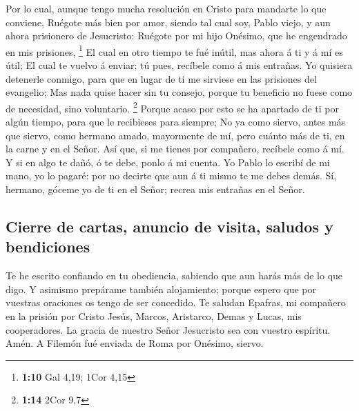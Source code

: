  Por lo cual, aunque tengo mucha resolución en Cristo para
mandarte lo que conviene,  Ruégote más bien por amor,
siendo tal cual soy, Pablo viejo, y aun ahora prisionero de Jesucristo:
 Ruégote por mi hijo Onésimo, que he engendrado en mis
prisiones, \footnote{\textbf{1:10} Gal 4,19; 1Cor 4,15} 
El cual en otro tiempo te fué inútil, mas ahora á ti y á mí es útil;
 El cual te vuelvo á enviar; tú pues, recíbele como á mis
entrañas.  Yo quisiera detenerle conmigo, para que en
lugar de ti me sirviese en las prisiones del evangelio; 
Mas nada quise hacer sin tu consejo, porque tu beneficio no fuese como
de necesidad, sino voluntario. \footnote{\textbf{1:14} 2Cor 9,7}
 Porque acaso por esto se ha apartado de ti por algún
tiempo, para que le recibieses para siempre;  No ya como
siervo, antes más que siervo, como hermano amado, mayormente de mí, pero
cuánto más de ti, en la carne y en el Señor.  Así que, si
me tienes por compañero, recíbele como á mí.  Y si en
algo te dañó, ó te debe, ponlo á mi cuenta.  Yo Pablo lo
escribí de mi mano, yo lo pagaré: por no decirte que aun á ti mismo te
me debes demás.  Sí, hermano, góceme yo de ti en el
Señor; recrea mis entrañas en el Señor.

\hypertarget{cierre-de-cartas-anuncio-de-visita-saludos-y-bendiciones}{%
\subsection{Cierre de cartas, anuncio de visita, saludos y
bendiciones}\label{cierre-de-cartas-anuncio-de-visita-saludos-y-bendiciones}}

 Te he escrito confiando en tu obediencia, sabiendo que
aun harás más de lo que digo.  Y asimismo prepárame
también alojamiento; porque espero que por vuestras oraciones os tengo
de ser concedido.  Te saludan Epafras, mi compañero en la
prisión por Cristo Jesús,  Marcos, Aristarco, Demas y
Lucas, mis cooperadores.  La gracia de nuestro Señor
Jesucristo sea con vuestro espíritu. Amén. A Filemón fué enviada de Roma
por Onésimo, siervo.
